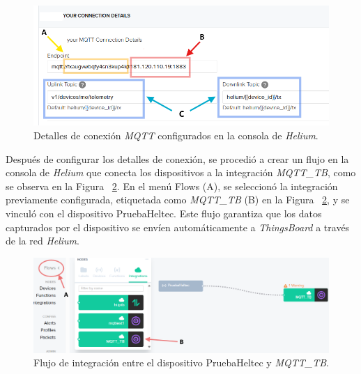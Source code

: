 \begin{figure}[H]
\leavevmode
\begin{minipage}{\textwidth}
\begin{center}
\includegraphics[width=1.0\textwidth]{./capitulo_04/imagen/tb2/detalisconect.png}
\caption{Detalles de conexión \textit{MQTT} configurados en la consola de \textit{Helium}. \label{fig:mqt_helsl}}
\end{center}
\end{minipage}
\end{figure}


Después de configurar los detalles de conexión, se procedió a crear un flujo en la consola de \textit{Helium} que conecta los dispositivos a la integración \textit{MQTT\_TB}, como se observa en la Figura ~\ref{fig:flow}. En el menú Flows (A), se seleccionó la integración previamente configurada, etiquetada como \textit{MQTT\_TB} (B) en la Figura ~\ref{fig:flow}, y se vinculó con el dispositivo PruebaHeltec. Este flujo garantiza que los datos capturados por el dispositivo se envíen automáticamente a \textit{ThingsBoard} a través de la red \textit{Helium}.







\begin{figure}[H]
\leavevmode
\begin{minipage}{\textwidth}
\begin{center}
\includegraphics[width=1.0\textwidth]{./capitulo_04/imagen/tb2/flowconf.png}
\caption{Flujo de integración entre el dispositivo PruebaHeltec y \textit{MQTT\_TB}. \label{fig:flow}}
\end{center}
\end{minipage}
\end{figure}

